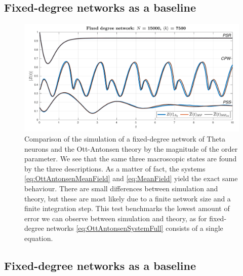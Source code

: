 \subsection{Fixed-degree networks as a baseline}
\begin{figure}[ht]
\centering
\includegraphics[width = \textwidth]{../Figures/InspectMeanFieldFixedDegree.pdf}
\caption{Comparison of the simulation of a fixed-degree network of Theta neurons and the Ott-Antonsen theory by the magnitude of the order parameter. We see that the same three macroscopic states are found by the three descriptions. As a matter of fact, the systems \eqref{eq:OttAntonsenMeanField} and \eqref{eq:MeanField} yield the exact same behaviour. There are small differences between simulation and theory, but these are most likely due to a finite network size and a finite integration step. This test benchmarks the lowest amount of error we can observe between simulation and theory, as for fixed-degree networks \eqref{eq:OttAntonsenSystemFull} consists of a single equation.}
\label{fig:InspectMeanFieldFixedDegree}
\end{figure}


\subsection{Fixed-degree networks as a baseline}

